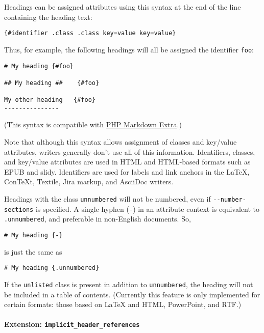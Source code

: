 \documentclass[
]{article}
\begin{document}
Headings can be assigned attributes using this syntax at the end of the
line containing the heading text:

\begin{verbatim}
{#identifier .class .class key=value key=value}
\end{verbatim}

Thus, for example, the following headings will all be assigned the
identifier \texttt{foo}:

\begin{verbatim}
# My heading {#foo}

## My heading ##    {#foo}

My other heading   {#foo}
---------------
\end{verbatim}

(This syntax is compatible with
\href{https://michelf.ca/projects/php-markdown/extra/}{PHP Markdown
Extra}.)

Note that although this syntax allows assignment of classes and
key/value attributes, writers generally don't use all of this
information. Identifiers, classes, and key/value attributes are used in
HTML and HTML-based formats such as EPUB and slidy. Identifiers are used
for labels and link anchors in the LaTeX, ConTeXt, Textile, Jira markup,
and AsciiDoc writers.

Headings with the class \texttt{unnumbered} will not be numbered, even
if \texttt{-\/-number-sections} is specified. A single hyphen
(\texttt{-}) in an attribute context is equivalent to
\texttt{.unnumbered}, and preferable in non-English documents. So,

\begin{verbatim}
# My heading {-}
\end{verbatim}

is just the same as

\begin{verbatim}
# My heading {.unnumbered}
\end{verbatim}

If the \texttt{unlisted} class is present in addition to
\texttt{unnumbered}, the heading will not be included in a table of
contents. (Currently this feature is only implemented for certain
formats: those based on LaTeX and HTML, PowerPoint, and RTF.)

\hypertarget{extension-implicit_header_references}{%
\paragraph{\texorpdfstring{Extension:
\texttt{implicit\_header\_references}}{Extension: implicit\_header\_references}}\label{extension-implicit_header_references}}
\end{document}
